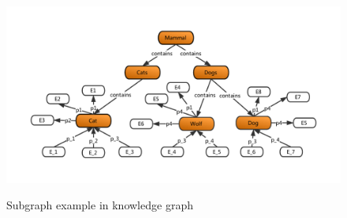 \begin{figure}
    \centering
    \includegraphics[width=1.1\textwidth]{pic/introduction.pdf}\\
    \caption{Subgraph example in knowledge graph}
    \label{weak1}
\end{figure}

